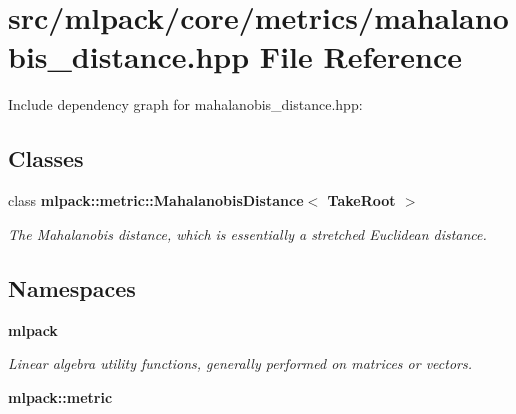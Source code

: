 \section{src/mlpack/core/metrics/mahalanobis\-\_\-distance.hpp File Reference}
\label{mahalanobis__distance_8hpp}
Include dependency graph for mahalanobis\-\_\-distance.\-hpp\-:
\subsection*{Classes}
\begin{DoxyCompactItemize}
\item 
class {\bf mlpack\-::metric\-::\-Mahalanobis\-Distance$<$ Take\-Root $>$}
\begin{DoxyCompactList}\small\item\em The Mahalanobis distance, which is essentially a stretched Euclidean distance. \end{DoxyCompactList}\end{DoxyCompactItemize}
\subsection*{Namespaces}
\begin{DoxyCompactItemize}
\item 
{\bf mlpack}
\begin{DoxyCompactList}\small\item\em Linear algebra utility functions, generally performed on matrices or vectors. \end{DoxyCompactList}\item 
{\bf mlpack\-::metric}
\end{DoxyCompactItemize}
